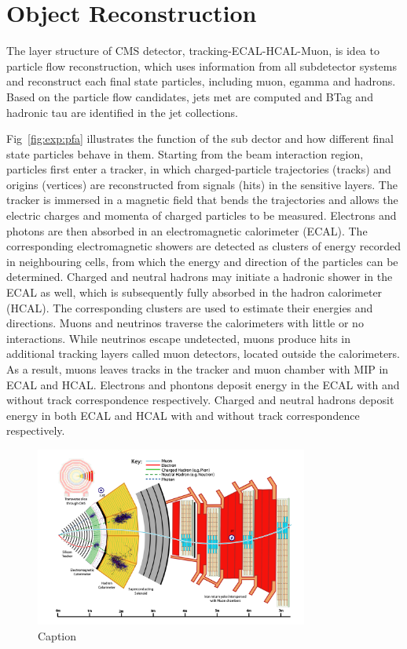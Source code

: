 
\section{Object Reconstruction}
\label{sec:cmsexperiment:reconstruction}

The layer structure of CMS detector, tracking-ECAL-HCAL-Muon, is idea to particle flow reconstruction, which uses information from all subdetector systems and reconstruct each final state particles, including muon, egamma and hadrons. Based on the particle flow candidates, jets met are computed and BTag and hadronic tau are identified in the jet collections. 

Fig~\ref{fig:exp:pfa} illustrates the function of the sub dector and how different final state particles behave in them. Starting from the beam interaction region, particles first enter a tracker, in which charged-particle trajectories (tracks) and origins (vertices) are reconstructed from signals (hits) in the sensitive layers. The tracker is immersed in a magnetic field that bends the trajectories and allows the electric charges and momenta of charged particles to be measured. Electrons and photons are then absorbed in an electromagnetic calorimeter (ECAL). The corresponding electromagnetic showers are detected as clusters of energy recorded in neighbouring cells, from which the energy and direction of the particles can be determined. Charged and neutral hadrons may initiate a hadronic shower in the ECAL as well, which is subsequently fully absorbed in the hadron calorimeter (HCAL). The corresponding clusters are used to estimate their energies and directions. Muons and neutrinos traverse the calorimeters with little or no interactions. While neutrinos escape undetected, muons produce hits in additional tracking layers called muon detectors, located outside the calorimeters. As a result,  muons leaves tracks in the tracker and muon chamber with MIP in ECAL and HCAL. Electrons and phontons deposit energy in the ECAL with and without track correspondence respectively. Charged and neutral hadrons deposit energy in both ECAL and HCAL with and without track correspondence respectively. 

\begin{figure}[ht]
    \centering
    \includegraphics[width=0.8\textwidth]{chapters/CMSExperiment/sectionReconstruction/figures/pfa.png}
    \caption{Caption}
    \label{fig:cmsexperiment:reconstruction:pfa}
\end{figure}

